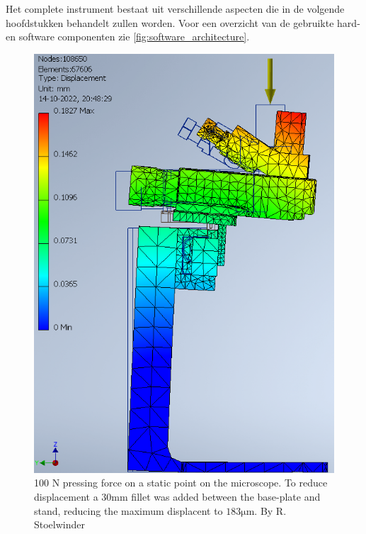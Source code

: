 \documentclass[11pt]{article}
\begin{document}
Het complete instrument bestaat uit verschillende aspecten die in de volgende hoofdstukken behandelt zullen worden. Voor een overzicht van de gebruikte hard- en software componenten zie \ref{fig:software_architecture}. 



\begin{figure}[H]
  \centering
  \begin{minipage}[b]{0.45\textwidth}
    \includegraphics[width=\textwidth]{img/rigidity_simulation/study_4.png}
    \caption{100 N pressing force on a static point on the microscope. To reduce displacement a $30\mathrm{mm}$ fillet was added between the base-plate and stand, reducing the maximum displacent to $183\mathrm{\mu m}$. By R. Stoelwinder }
    \label{fig:disp_study5}
  \end{minipage}
  \hfill
  \begin{minipage}[b]{0.45\textwidth}

\end{minipage}
\end{figure}
\end{document}
